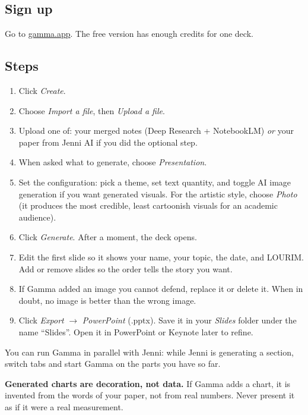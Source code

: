 \documentclass[11pt,a4paper]{article}
\begin{document}
\subsection*{Sign up}
Go to \href{https://gamma.app/}{gamma.app}. The free version has enough credits for one deck.

\subsection*{Steps}
\begin{enumerate}[leftmargin=*, itemsep=2pt]
  \item Click \emph{Create}.
  \item Choose \emph{Import a file}, then \emph{Upload a file}.
  \item Upload one of: your merged notes (Deep Research + NotebookLM) \emph{or} your paper from Jenni AI if you did the optional step.
  \item When asked what to generate, choose \emph{Presentation}.
  \item Set the configuration: pick a theme, set text quantity, and toggle AI image generation if you want generated visuals. For the artistic style, choose \emph{Photo} (it produces the most credible, least cartoonish visuals for an academic audience).
  \item Click \emph{Generate}. After a moment, the deck opens.
  \item Edit the first slide so it shows your name, your topic, the date, and LOURIM. Add or remove slides so the order tells the story you want.
  \item If Gamma added an image you cannot defend, replace it or delete it. When in doubt, no image is better than the wrong image.
  \item Click \emph{Export} \(\to\) \emph{PowerPoint} (.pptx). Save it in your \emph{Slides} folder under the name ``Slides''. Open it in PowerPoint or Keynote later to refine.
\end{enumerate}

\begin{tipbox}
You can run Gamma in parallel with Jenni: while Jenni is generating a section, switch tabs and start Gamma on the parts you have so far.
\end{tipbox}

\begin{watchout}
\textbf{Generated charts are decoration, not data.} If Gamma adds a chart, it is invented from the words of your paper, not from real numbers. Never present it as if it were a real measurement.
\end{watchout}
\end{document}
